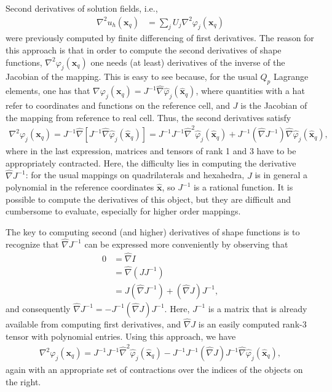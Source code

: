 \documentclass{ansarticle-preprint}
\begin{document}
Second derivatives of solution fields, i.e., 
\begin{align*}
  \nabla^2 u_h(\mathbf x_q) &= \sum_{j} U_j \nabla^2\varphi_j(\mathbf x_q)
\end{align*}
were previously computed by finite differencing of first
derivatives. The reason for this approach is that in order to compute
the second derivatives of shape functions, $\nabla^2\varphi_j(\mathbf
x_q)$ one needs (at least) derivatives of the inverse of the Jacobian of the
mapping. This is easy to see because, for the usual $Q_p$ Lagrange
elements, one has that $\nabla\varphi_j(\mathbf
x_q)=J^{-1}\hat\nabla\hat\varphi_j(\hat{\mathbf x}_q)$, where quantities
with a hat refer to coordinates and functions on the reference cell,
and $J$ is the Jacobian of the mapping from reference to real
cell. Thus, the second derivatives satisfy
\begin{align*}
  \nabla^2\varphi_j(\mathbf x_q)
  =
  J^{-1}\hat\nabla\left[J^{-1}\hat\nabla\hat\varphi_j(\hat{\mathbf x}_q)\right]
  =
  J^{-1} J^{-1}\hat\nabla^2\hat\varphi_j(\hat{\mathbf x}_q)
  +
  J^{-1}\left(\hat\nabla J^{-1}\right)\hat\nabla\hat\varphi_j(\hat{\mathbf x}_q),
\end{align*}
where in the last expression, matrices and tensors of rank 1 and 3
have to be appropriately contracted.  Here, the difficulty lies in
computing the derivative $\hat\nabla J^{-1}$: for the usual mappings
on quadrilaterals and hexahedra, $J$ is in general a polynomial in the
reference coordinates $\hat {\mathbf x}$, so $J^{-1}$ is a rational
function. It is possible to compute the derivatives of this object,
but they are difficult and cumbersome to evaluate, especially for
higher order mappings.

The key to computing second (and higher) derivatives of shape
functions is to recognize that $\hat\nabla J^{-1}$ can be expressed
more conveniently by observing that
\begin{align*}
  0 &= \hat\nabla I
  \\
  &= \hat\nabla (JJ^{-1})
  \\
  &= J (\hat\nabla J^{-1}) + (\hat\nabla J) J^{-1},
\end{align*}
and consequently $\hat\nabla J^{-1} = - J^{-1} (\hat\nabla J)
J^{-1}$. Here, $J^{-1}$ is a matrix that is already available from
computing first derivatives, and $\hat\nabla J$ is an easily computed
rank-3 tensor with polynomial entries. Using this approach, we have
\begin{align*}
  \nabla^2\varphi_j(\mathbf x_q)
  =
  J^{-1} J^{-1}\hat\nabla^2\hat\varphi_j(\hat{\mathbf x}_q)
  -
  J^{-1} J^{-1} (\hat\nabla J)
  J^{-1}\hat\nabla\hat\varphi_j(\hat{\mathbf x}_q),
\end{align*}
again with an appropriate set of contractions over the indices of the
objects on the right.
\end{document}
